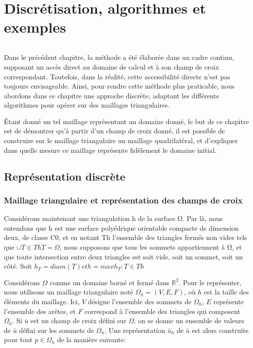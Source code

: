 \chapter{Discrétisation, algorithmes et exemples}
\label{chap:alorithme}
\minitoc

\[\]

Dans le précédent chapitre, la méthode a été élaborée dans un cadre continu, supposant un accès direct au domaine de calcul et à son champ de croix correspondant. Toutefois, dans la réalité, cette accessibilité directe n'est pas toujours envisageable. Ainsi, pour rendre cette méthode plus praticable, nous abordons dans ce chapitre une approche discrète, adaptant les différents algorithmes pour opérer sur des maillages triangulaires.

\'Etant donné un tel maillage représentant un domaine donné, le but de ce chapitre est de démontrer qu'à partir d'un champ de croix donné, il est possible de construire sur le maillage triangulaire un maillage quadrilatéral, et d'expliquer dans quelle mesure ce maillage représente fidèlement le domaine initial.

\section{Représentation discrète}

\subsection{Maillage triangulaire et représentation des  champs de croix}

Considérons maintenant une triangulation h de la surface Ω. Par là, nous entendons que h est une surface polyédrique orientable compacte de dimension deux, de classe C0, et en notant Th l'ensemble des triangles fermés non vides tels que $∪T \in Th T = Ω$, nous supposons que tous les sommets appartiennent à Ω, et que toute intersection entre deux triangles est soit vide, soit un sommet, soit un côté. Soit $h_T = diam(T) et h = max{h_T : T \in Th}$

Considérons $\Omega$ comme un domaine borné et fermé dans $\mathbb{R}^2$. Pour le représenter, nous utilisons un maillage triangulaire noté $\Omega_h=(V, E, F)$, où $h$ est la taille des éléments du maillage. Ici, $V$ désigne l'ensemble des sommets de $\Omega_h$, $E$ représente l'ensemble des arêtes, et $F$ correspond à l'ensemble des triangles qui composent $\Omega_h$. Si $\bar{u}$ est un champ de croix défini sur $\Omega$, on se donne un ensemble de valeurs de $\bar{u}$ défini sur les sommets de $\Omega_h$. Une représentation $\bar{u}_h$ de $\bar{u}$ est alors construite pour tout $p\in\Omega_h$ de la manière suivante:

